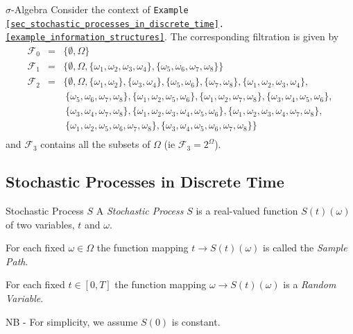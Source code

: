 \documentclass[11pt,a4paper]{article}
\begin{document}
  \begin{example}{$\sigma$-Algebra}
    Consider the context of \texttt{Example \ref{sec_stochastic_processes_in_discrete_time}.\ref{example_information_structures}}. The corresponding filtration is given by
    \[\begin{array}{rcl}
      \mathcal{F}_0&=&\big\{\emptyset,\Omega\big\}\\

      \mathcal{F}_1&=&\big\{\emptyset,\Omega,\{\omega_1,\omega_2,\omega_3,\omega_4\},\{\omega_5,\omega_6,\omega_7,\omega_8\}\big\}\\

      \mathcal{F}_2&=&\big\{\emptyset,\Omega,\{\omega_1,\omega_2\},\{\omega_3,\omega_4\},\{\omega_5,\omega_6\},\{\omega_7,\omega_8\},\{\omega_1,\omega_2,\omega_3,\omega_4\},\\
      &&\ \{\omega_5,\omega_6,\omega_7,\omega_8\},\{\omega_1,\omega_2,\omega_5,\omega_6\},\{\omega_1,\omega_2,\omega_7,\omega_8\},\{\omega_3,\omega_4,\omega_5,\omega_6\},\\
      &&\ \{\omega_3,\omega_4,\omega_7,\omega_8\},\{\omega_1,\omega_2,\omega_3,\omega_4,\omega_5,\omega_6\},\{\omega_1,\omega_2,\omega_3,\omega_4,\omega_7,\omega_8\},\\
      &&\ \{\omega_1,\omega_2,\omega_5,\omega_6,\omega_7,\omega_8\},\{\omega_3,\omega_4,\omega_5,\omega_6,\omega_7,\omega_8\}\big\}\\
    \end{array}\]
    and $\mathcal{F}_3$ contains all the subsets of $\Omega$ (ie $\mathcal{F}_3=2^\Omega$).
  \end{example}

\subsection{Stochastic Processes in Discrete Time}

  \begin{definition}{Stochastic Process $S$}
    A \textit{Stochastic Process} $S$ is a real-valued function $S(t)(\omega)$ of two variables, $t$ and $\omega$.
    \par For each fixed $\omega\in\Omega$ the function mapping $t\to S(t)(\omega)$ is called the \textit{Sample Path}.
    \par For each fixed $t\in[0,T]$ the function mapping $\omega\to S(t)(\omega)$ is a \textit{Random Variable}.
    \par NB - For simplicity, we assume $S(0)$ is constant.
  \end{definition}
\end{document}
